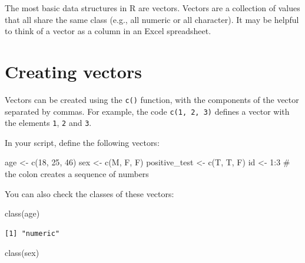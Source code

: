 \documentclass[
  letterpaper,
  DIV=11,
  numbers=noendperiod]{scrreprt}
\newenvironment{Shaded}{\begin{snugshade}}{\end{snugshade}}
\newcommand{\CommentTok}[1]{\textcolor[rgb]{0.37,0.37,0.37}{#1}}
\newcommand{\DecValTok}[1]{\textcolor[rgb]{0.68,0.00,0.00}{#1}}
\newcommand{\FunctionTok}[1]{\textcolor[rgb]{0.28,0.35,0.67}{#1}}
\newcommand{\NormalTok}[1]{\textcolor[rgb]{0.00,0.23,0.31}{#1}}
\newcommand{\OtherTok}[1]{\textcolor[rgb]{0.00,0.23,0.31}{#1}}
\newcommand{\SpecialCharTok}[1]{\textcolor[rgb]{0.37,0.37,0.37}{#1}}
\newcommand{\StringTok}[1]{\textcolor[rgb]{0.13,0.47,0.30}{#1}}
\begin{document}
The most basic data structures in R are vectors. Vectors are a
collection of values that all share the same class (e.g., all numeric or
all character). It may be helpful to think of a vector as a column in an
Excel spreadsheet.

\section{Creating vectors}\label{creating-vectors}

Vectors can be created using the \texttt{c()} function, with the
components of the vector separated by commas. For example, the code
\texttt{c(1,\ 2,\ 3)} defines a vector with the elements \texttt{1},
\texttt{2} and \texttt{3}.

In your script, define the following vectors:

\begin{Shaded}
\begin{Highlighting}[]
\NormalTok{age }\OtherTok{\textless{}{-}} \FunctionTok{c}\NormalTok{(}\DecValTok{18}\NormalTok{, }\DecValTok{25}\NormalTok{, }\DecValTok{46}\NormalTok{)}
\NormalTok{sex }\OtherTok{\textless{}{-}} \FunctionTok{c}\NormalTok{(}\StringTok{\textquotesingle{}M\textquotesingle{}}\NormalTok{, }\StringTok{\textquotesingle{}F\textquotesingle{}}\NormalTok{, }\StringTok{\textquotesingle{}F\textquotesingle{}}\NormalTok{)}
\NormalTok{positive\_test }\OtherTok{\textless{}{-}} \FunctionTok{c}\NormalTok{(T, T, F)}
\NormalTok{id }\OtherTok{\textless{}{-}} \DecValTok{1}\SpecialCharTok{:}\DecValTok{3} \CommentTok{\# the colon creates a sequence of numbers}
\end{Highlighting}
\end{Shaded}

You can also check the classes of these vectors:

\begin{Shaded}
\begin{Highlighting}[]
\FunctionTok{class}\NormalTok{(age)}
\end{Highlighting}
\end{Shaded}

\begin{verbatim}
[1] "numeric"
\end{verbatim}

\begin{Shaded}
\begin{Highlighting}[]
\FunctionTok{class}\NormalTok{(sex)}
\end{Highlighting}
\end{Shaded}
\end{document}
